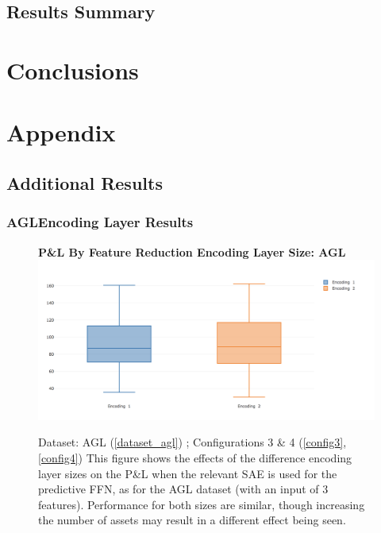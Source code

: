 \documentclass[a4paper,11pt,oneside]{article}
\theoremstyle{plain}
\theoremstyle{definition}
\begin{document}
\newpage
\subsection{Results Summary}









\newpage
\section{Conclusions}\label{Conclusion}


\newpage
\section{Appendix}\label{Appendix}

\subsection{Additional Results}

\subsubsection{AGLEncoding Layer Results}

\begin{figure}[H]
	\centering 
	\textbf{P\&L By Feature Reduction Encoding Layer Size: AGL}
	\includegraphics[scale=0.35]{images/iteration_five/it5_encoding_size_agl.png} 
	\caption{Dataset: AGL (\ref{dataset_agl}) ; Configurations 3 \& 4 (\ref{config3}, \ref{config4}) 
		\newline This figure shows the effects of the difference encoding layer sizes on the P\&L when the relevant SAE is used for the predictive FFN, as for the AGL dataset (with an input of 3 features). Performance for both sizes are similar, though increasing the number of assets may result in a different effect being seen.}
	\label{figure-results_encoding_agl}
\end{figure}
\end{document}
